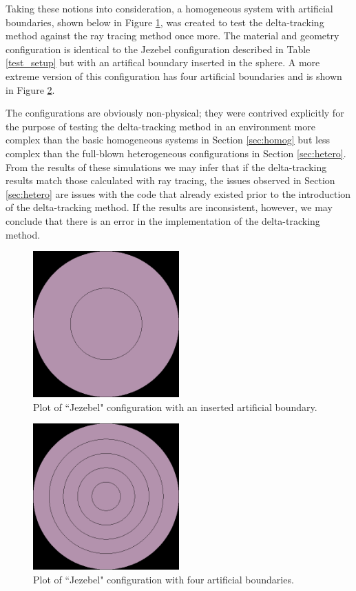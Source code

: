 Taking these notions into consideration, a homogeneous system with artificial boundaries, shown below in 
Figure \ref{jezebel-shells}, was created to test the delta-tracking method against the ray tracing 
method once more. The material and geometry configuration is identical to the Jezebel configuration
described in Table \ref{test_setup} but with an artifical boundary inserted in the sphere. A more
extreme version of this configuration has four artificial boundaries and is shown in Figure 
\ref{jezebel-five}.

The configurations are obviously non-physical; they were contrived explicitly for the purpose of testing
the delta-tracking method in an environment more complex than the basic homogeneous systems in Section
\ref{sec:homog} but less complex than the full-blown heterogeneous configurations in Section 
\ref{sec:hetero}. From the results of these simulations we may infer that if the delta-tracking results
match those calculated with ray tracing, the issues observed in Section \ref{sec:hetero} are issues with
the code that already existed prior to the introduction of the delta-tracking method. If the results are
inconsistent, however, we may conclude that there is an error in the implementation of the delta-tracking
method.

\begin{figure}[h!]
\centering
\includegraphics[width=0.5\textwidth]{img/jezebel-shells.png}
\caption{Plot of ``Jezebel" configuration with an inserted artificial boundary. \label{jezebel-shells}}
\end{figure}

\begin{figure}[h!]
\centering
\includegraphics[width=0.5\textwidth]{img/jezebel-shells-five.png}
\caption{Plot of ``Jezebel" configuration with four artificial boundaries. \label{jezebel-five}}
\end{figure}

